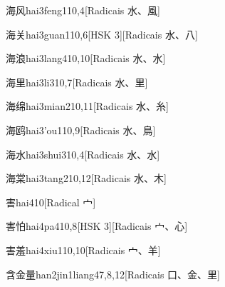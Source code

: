 \begin{entry}{海风}{hai3feng1}{10,4}[Radicais ⽔、⾵]
\end{entry}

\begin{entry}{海关}{hai3guan1}{10,6}[HSK 3][Radicais ⽔、⼋]
\end{entry}

\begin{entry}{海浪}{hai3lang4}{10,10}[Radicais ⽔、⽔]
\end{entry}

\begin{entry}{海里}{hai3li3}{10,7}[Radicais ⽔、⾥]
\end{entry}

\begin{entry}{海绵}{hai3mian2}{10,11}[Radicais ⽔、⽷]
\end{entry}

\begin{entry}{海鸥}{hai3'ou1}{10,9}[Radicais ⽔、⿃]
\end{entry}

\begin{entry}{海水}{hai3shui3}{10,4}[Radicais ⽔、⽔]
\end{entry}

\begin{entry}{海棠}{hai3tang2}{10,12}[Radicais ⽔、⽊]
\end{entry}

\begin{entry}{害}{hai4}{10}[Radical ⼧]
\end{entry}

\begin{entry}{害怕}{hai4pa4}{10,8}[HSK 3][Radicais ⼧、⼼]
\end{entry}

\begin{entry}{害羞}{hai4xiu1}{10,10}[Radicais ⼧、⽺]
\end{entry}

\begin{entry}{含金量}{han2jin1liang4}{7,8,12}[Radicais ⼝、⾦、⾥]
\end{entry}

